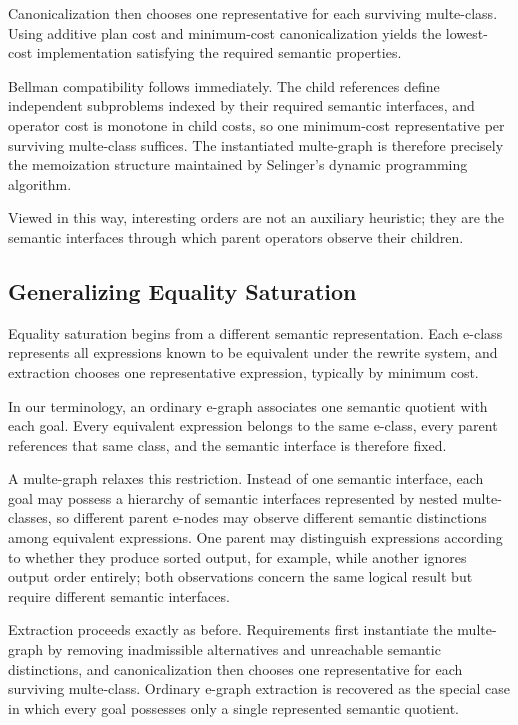 \documentclass[sigconf,nonacm]{acmart}
\theoremstyle{definition}
\theoremstyle{plain}
\theoremstyle{remark}
\begin{document}
Canonicalization then chooses one representative for each surviving
multe-class.  Using additive plan cost and minimum-cost
canonicalization yields the lowest-cost implementation satisfying the
required semantic properties.

Bellman compatibility follows immediately.  The child references define
independent subproblems indexed by their required semantic interfaces,
and operator cost is monotone in child costs, so one minimum-cost
representative per surviving multe-class suffices.  The instantiated
multe-graph is therefore precisely the memoization structure maintained
by Selinger's dynamic programming algorithm.

Viewed in this way, interesting orders are not an auxiliary heuristic;
they are the semantic interfaces through which parent operators observe
their children.

\subsection{Generalizing Equality Saturation}
\label{sec:egraphs-example}

Equality saturation begins from a different semantic representation.
Each e-class represents all expressions known to be equivalent under
the rewrite system, and extraction chooses one representative
expression, typically by minimum cost.

In our terminology, an ordinary e-graph associates one semantic
quotient with each goal.  Every equivalent expression belongs to the
same e-class, every parent references that same class, and the semantic
interface is therefore fixed.

A multe-graph relaxes this restriction.  Instead of one semantic
interface, each goal may possess a hierarchy of semantic interfaces
represented by nested multe-classes, so different parent e-nodes may
observe different semantic distinctions among equivalent expressions.
One parent may distinguish expressions according to whether they
produce sorted output, for example, while another ignores output order
entirely; both observations concern the same logical result but require
different semantic interfaces.

Extraction proceeds exactly as before.  Requirements first instantiate
the multe-graph by removing inadmissible alternatives and unreachable
semantic distinctions, and canonicalization then chooses one
representative for each surviving multe-class.  Ordinary e-graph
extraction is recovered as the special case in which every goal
possesses only a single represented semantic quotient.
\end{document}
